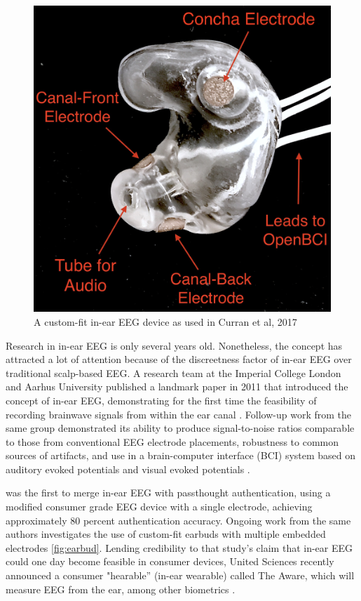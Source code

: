 \documentclass[sigconf]{acmart}
\begin{document}
\label{fig:earbud}
\begin{figure}[t!]
\centering
\includegraphics[width=.9\linewidth]{./figures/custom-fit-eeg-annotated.jpg}
\caption{A custom-fit in-ear EEG device as used in Curran et al, 2017}
\end{figure}

Research in in-ear EEG is only several years old. Nonetheless, the concept has
attracted a lot of attention because of the discreetness factor of in-ear EEG over
traditional scalp-based EEG. A research team at the Imperial College London
and Aarhus University published a landmark paper in 2011 that introduced the
concept of in-ear EEG, demonstrating for the first time the feasibility of recording
brainwave signals from within the ear canal
\cite{Looney2011}.
Follow-up work from the same
group demonstrated its ability to produce signal-to-noise ratios comparable to
those from conventional EEG electrode placements, robustness to common
sources of artifacts, and use in a brain-computer interface (BCI) system based on
auditory evoked potentials and visual evoked potentials
\cite{Looney2012a,Kidmose2013a,Kidmose2013b}.


\cite{curranpassthoughts} was the first to merge in-ear EEG with passthought authentication,
 using a modified consumer grade EEG device with a single electrode, achieving approximately 80 percent authentication accuracy. 
Ongoing work from the same authors investigates the use of custom-fit earbuds with multiple embedded electrodes \ref{fig:earbud}.
Lending credibility to that study's claim that in-ear EEG could one day become feasible in consumer devices,
United Sciences recently announced a consumer "hearable'' (in-ear wearable) called The Aware, which will measure EEG from the ear, among other biometrics \cite{UnitedSciences}.
\end{document}
